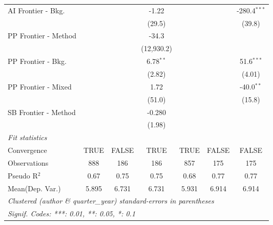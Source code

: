 \begin{tabular}{lcccccc}
   AI Frontier - Bkg.   &               &             & -1.22       &               &                & -280.4$^{***}$\\   
                        &               &             & (29.5)      &               &                & (39.8)\\   
   PP Frontier - Method &               &             & -34.3       &               &                &   \\   
                        &               &             & (12,930.2)  &               &                &   \\   
   PP Frontier - Bkg.   &               &             & 6.78$^{**}$ &               &                & 51.6$^{***}$\\   
                        &               &             & (2.82)      &               &                & (4.01)\\   
   PP Frontier - Mixed  &               &             & 1.72        &               &                & -40.0$^{**}$\\   
                        &               &             & (51.0)      &               &                & (15.8)\\   
   SB Frontier - Method &               &             & -0.280      &               &                &   \\   
                        &               &             & (1.98)      &               &                &   \\   
   \midrule
   \emph{Fit statistics}\\
   Convergence          &TRUE           & FALSE       & TRUE        & TRUE          & FALSE          & FALSE\\  
   Observations         & 888           & 186         & 186         & 857           & 175            & 175\\  
   Pseudo R$^2$         & 0.67          & 0.75        & 0.75        & 0.68          & 0.77           & 0.77\\  
Mean(Dep. Var.) & 5.895 & 6.731 & 6.731 & 5.931 & 6.914 & 6.914 \\
   \midrule \midrule
   \multicolumn{7}{l}{\emph{Clustered (author \& quarter\_year) standard-errors in parentheses}}\\
   \multicolumn{7}{l}{\emph{Signif. Codes: ***: 0.01, **: 0.05, *: 0.1}}\\
\end{tabular}
\par\endgroup
